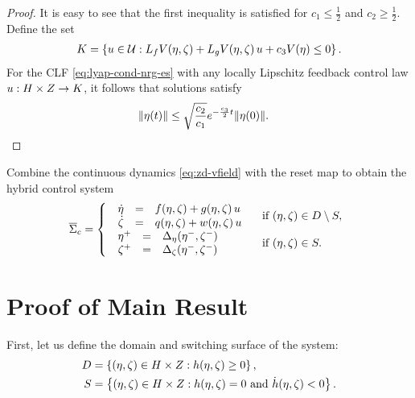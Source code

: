 \documentclass[twocolumn]{article}
\begin{document}
\begin{proof}
  It is easy to see that the first inequality is satisfied for $c_{1} \leq \frac{1}{2}$ and $c_{2} \geq \frac{1}{2}$.
  Define the set
  \begin{align}
    K = \left\{ u \in \mathcal{U} : L_{f} V(\eta, \zeta) + L_{g} V(\eta, \zeta) \, u + c_{3} V(\eta) \leq 0 \right\}.
  \end{align}
  For the CLF \eqref{eq:lyap-cond-nrg-es} with any locally Lipschitz feedback control law $u : H \times Z \to K$, it follows that solutions satisfy
  \begin{align*}
    \| \eta(t) \| \leq \sqrt{\frac{c_{2}}{c_{1}}} e^{-\frac{c_{3}}{2} t} \| \eta(0) \|. & \qedhere
  \end{align*}
  
\end{proof}

Combine the continuous dynamics \eqref{eq:zd-vfield} with the reset map to obtain the hybrid control system
\begin{align}
  \label{eq:hcsys}
        {\overline \Sigma}_{c }= \left\{
        \begin{array}{l l}
          \begin{array}{r c l}
            {\dot \eta} &=& f(\eta, \zeta) + g(\eta, \zeta) \, u\\
            {\dot \zeta} &=& q(\eta, \zeta) + w(\eta, \zeta) \, u
          \end{array} & \mbox{ if } (\eta, \zeta) \in D \setminus S,\\
          \begin{array}{r c l}
            \eta^{+} &=& \Delta_{\eta}(\eta^{-}, \zeta^{-})\\
            \zeta^{+} &=& \Delta_{\zeta}(\eta^{-}, \zeta^{-})
          \end{array} & \mbox{ if } (\eta, \zeta) \in S.
        \end{array}\right.
\end{align}

\section{Proof of Main Result}

First, let us define the domain and switching surface of the system:
\begin{align}
  D &= \left\{ (\eta, \zeta) \in H \times Z : h(\eta, \zeta) \geq 0 \right\},\\
  \nonumber
  S &= \left\{ (\eta, \zeta) \in H \times Z : h(\eta, \zeta) = 0 \mbox{ and } {\dot h}(\eta, \zeta) < 0 \right\}.
\end{align}
\end{document}

